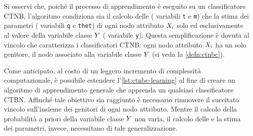 Si osservi che, poiché il processo di apprendimento è eseguito su un classificatore \acs{CTNB}, l'algoritmo condiziona sia il calcolo delle \stats{} (\ie{} variabili \lstinline[]|t| e \lstinline[]|m|) che la stima dei parametri (\ie{} variabili \lstinline[]|q| e \lstinline[]|thet|) di ogni nodo attributo $\mathnormal{X}_i$ solo ed esclusivamente al valore della variabile classe $\mathnormal{Y}$ (\ie{} variabile \lstinline[]|y|). Questa semplificazione è dovuta al vincolo che caratterizza i classificatori \acs{CTNB}: ogni nodo attributo $\mathnormal{X}_i$ ha un solo genitore, il nodo associato alla variabile classe $\mathnormal{Y}$ (si veda la \autoref{defn:ctnbc}).

Come anticipato, al costo di un leggero incremento di complessità computazionale, è possibile estendere l'\autoref{lst:ctnbc-learning} al fine di creare un algoritmo di apprendimento generale che apprenda un qualsiasi classificatore \acs{CTBN}. Affinché tale obiettivo sia raggiunto è necessario rimuovere il succitato vincolo sull'insieme dei genitori di ogni nodo attributo. Mentre il calcolo della probabilità a priori della variabile classe $\mathnormal{Y}$ non varia, il calcolo delle \stats{} e la stima dei parametri, invece, necessitano di tale generalizzazione.

